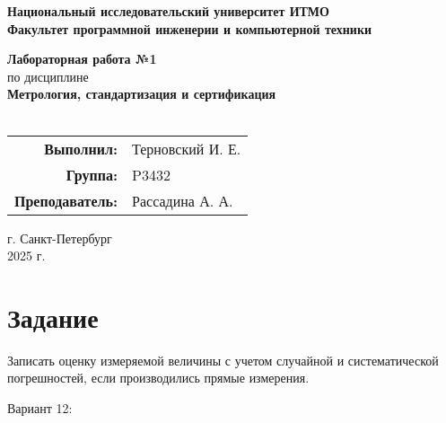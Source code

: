 \documentclass[12pt, a4paper]{article}
\begin{document}
	
	\begin{titlepage}
		\begin{center}
			
			
			{\LARGE\textbf{Национальный исследовательский университет ИТМО}}\\[0.5cm]
			{\large\textbf{Факультет программной инженерии и компьютерной техники}}\\[1.5cm]
			
			\vfill
			
			{\Large\textbf{Лабораторная работа №1}}\\[0.5cm]
			{\Large по дисциплине}\\[0.3cm]
			{\Large\textbf{Метрология, стандартизация и сертификация}}\\[0.5cm]
			{\large{}}\\[0.5cm]
			
			\vfill
			
			\begin{flushright}
				\large
				\begin{tabular}{rl}
					\textbf{Выполнил:} & Терновский И. Е. \\
					\textbf{Группа:} & P3432 \\
					\textbf{Преподаватель:} & Рассадина А. А. \\
				\end{tabular}
			\end{flushright}
			
			\vfill
			
			{\large г. Санкт-Петербург}\\[0.3cm]
			{\large 2025 г.}
			
		\end{center}
		\restoregeometry
	\end{titlepage}
	
	
	\section*{Задание}
	
	Записать оценку измеряемой величины с учетом случайной и
	систематической погрешностей, если производились прямые измерения.
	
	Вариант 12:
	
\end{document}
